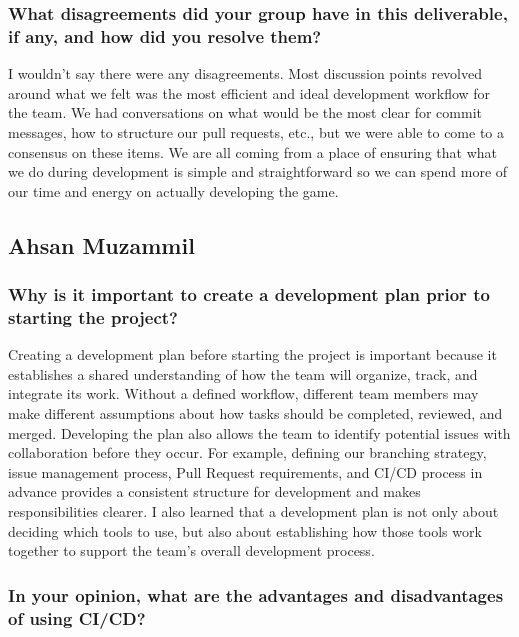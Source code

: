 \documentclass{article}
\begin{document}
\subsubsection*{What disagreements did your group have in this deliverable, if any, and how did you resolve them?}
I wouldn't say there were any disagreements. Most discussion points revolved around what we felt was the most efficient and ideal
development workflow for the team. We had conversations on what would be the most clear for commit messages, how to structure
our pull requests, etc., but we were able to come to a consensus on these items. We are all coming from a place of ensuring that
what we do during development is simple and straightforward so we can spend more of our time and energy on actually developing
the game.

\subsection*{Ahsan Muzammil}

\subsubsection*{Why is it important to create a development plan prior to starting the project?}

Creating a development plan before starting the project is important because it establishes a shared understanding of how the team will organize, track, and integrate its work. Without a defined workflow, different team members may make different assumptions about how tasks should be completed, reviewed, and merged. Developing the plan also allows the team to identify potential issues with collaboration before they occur. For example, defining our branching strategy, issue management process, Pull Request requirements, and CI/CD process in advance provides a consistent structure for development and makes responsibilities clearer. I also learned that a development plan is not only about deciding which tools to use, but also about establishing how those tools work together to support the team's overall development process.

\subsubsection*{In your opinion, what are the advantages and disadvantages of using CI/CD?}
\end{document}
